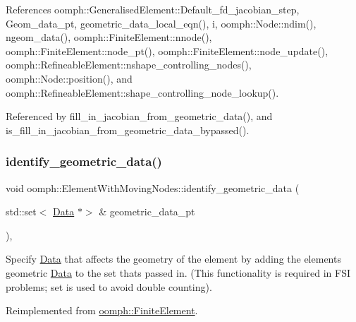 References oomph\+::\+Generalised\+Element\+::\+Default\+\_\+fd\+\_\+jacobian\+\_\+step, Geom\+\_\+data\+\_\+pt, geometric\+\_\+data\+\_\+local\+\_\+eqn(), i, oomph\+::\+Node\+::ndim(), ngeom\+\_\+data(), oomph\+::\+Finite\+Element\+::nnode(), oomph\+::\+Finite\+Element\+::node\+\_\+pt(), oomph\+::\+Finite\+Element\+::node\+\_\+update(), oomph\+::\+Refineable\+Element\+::nshape\+\_\+controlling\+\_\+nodes(), oomph\+::\+Node\+::position(), and oomph\+::\+Refineable\+Element\+::shape\+\_\+controlling\+\_\+node\+\_\+lookup().



Referenced by fill\+\_\+in\+\_\+jacobian\+\_\+from\+\_\+geometric\+\_\+data(), and is\+\_\+fill\+\_\+in\+\_\+jacobian\+\_\+from\+\_\+geometric\+\_\+data\+\_\+bypassed().

\mbox{\label{classoomph_1_1ElementWithMovingNodes_ab19e7a475828f119dd97772bb42a63a4}} 
\subsubsection{\texorpdfstring{identify\+\_\+geometric\+\_\+data()}{identify\_geometric\_data()}}
{\footnotesize\ttfamily void oomph\+::\+Element\+With\+Moving\+Nodes\+::identify\+\_\+geometric\+\_\+data (\begin{DoxyParamCaption}\item[{std\+::set$<$ \hyperlink{classoomph_1_1Data}{Data} $\ast$$>$ \&}]{geometric\+\_\+data\+\_\+pt }\end{DoxyParamCaption})\hspace{0.3cm}{\ttfamily [inline]}, {\ttfamily [virtual]}}



Specify \hyperlink{classoomph_1_1Data}{Data} that affects the geometry of the element by adding the element\textquotesingle{}s geometric \hyperlink{classoomph_1_1Data}{Data} to the set that\textquotesingle{}s passed in. (This functionality is required in F\+SI problems; set is used to avoid double counting). 



Reimplemented from \hyperlink{classoomph_1_1FiniteElement_af60133cebd1961567b1160782467ad58}{oomph\+::\+Finite\+Element}.



